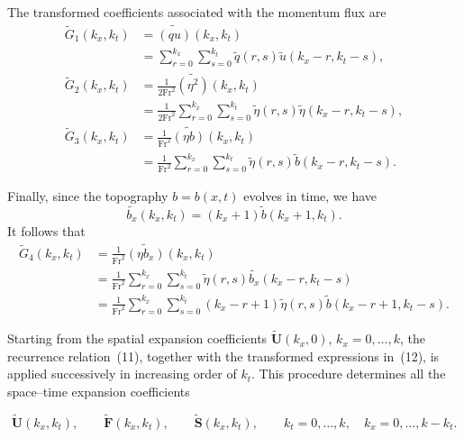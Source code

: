 \documentclass[11pt]{article}
\begin{document}
The transformed coefficients associated with the momentum flux are
\begin{align*}
    \widetilde{G}_1(k_x,k_t)
    &=
    \widetilde{(qu)}(k_x,k_t)                                     \\
    &=
    \sum_{r=0}^{k_x}\sum_{s=0}^{k_t}
    \widetilde{q}(r,s)
    \widetilde{u}(k_x-r,k_t-s),                                   \\[0.6em]
    \widetilde{G}_2(k_x,k_t)
    &=
    \frac{1}{2\mathrm{Fr}^2}\widetilde{(\eta^2)}(k_x,k_t)                       \\
    &=
    \frac{1}{2\mathrm{Fr}^2}
    \sum_{r=0}^{k_x}\sum_{s=0}^{k_t}
    \widetilde{\eta}(r,s)
    \widetilde{\eta}(k_x-r,k_t-s),                                \\[0.6em]
    \widetilde{G}_3(k_x,k_t)
    &=
    \frac{1}{\mathrm{Fr}^2}\widetilde{(\eta b)}(k_x,k_t)                              \\
    &=
    \frac{1}{\mathrm{Fr}^2}
    \sum_{r=0}^{k_x}\sum_{s=0}^{k_t}
    \widetilde{\eta}(r,s)
    \widetilde{b}(k_x-r,k_t-s).
\end{align*}

Finally, since the topography \(b=b(x,t)\) evolves in time, we have
\[
    \widetilde{b_x}(k_x,k_t)
    =
    (k_x+1)\widetilde{b}(k_x+1,k_t).
\]
It follows that
\begin{align*}
    \widetilde{G}_4(k_x,k_t)
    &=
    \frac{1}{\mathrm{Fr}^2}\widetilde{(\eta b_x)}(k_x,k_t)                             \\
    &=
    \frac{1}{\mathrm{Fr}^2}
    \sum_{r=0}^{k_x}\sum_{s=0}^{k_t}
    \widetilde{\eta}(r,s)
    \widetilde{b_x}(k_x-r,k_t-s)                                  \\
    &=
    \frac{1}{\mathrm{Fr}^2}
    \sum_{r=0}^{k_x}\sum_{s=0}^{k_t}
    (k_x-r+1)
    \widetilde{\eta}(r,s)
    \widetilde{b}(k_x-r+1,k_t-s).
\end{align*}


Starting from the spatial expansion coefficients \(\widetilde{\mathbf{U}}(k_x,0)\), \(k_x=0,\ldots,k\), the recurrence relation~(11), together with the transformed expressions in~(12), is applied successively in increasing order of \(k_t\). This procedure determines all the space--time expansion coefficients

\[
    \widetilde{\mathbf{U}}(k_x,k_t),\qquad
    \widetilde{\mathbf{F}}(k_x,k_t),\qquad
    \widetilde{\mathbf{S}}(k_x,k_t),
    \qquad
    k_t=0,\ldots,k,\quad
    k_x=0,\ldots,k-k_t.
\]
\end{document}
